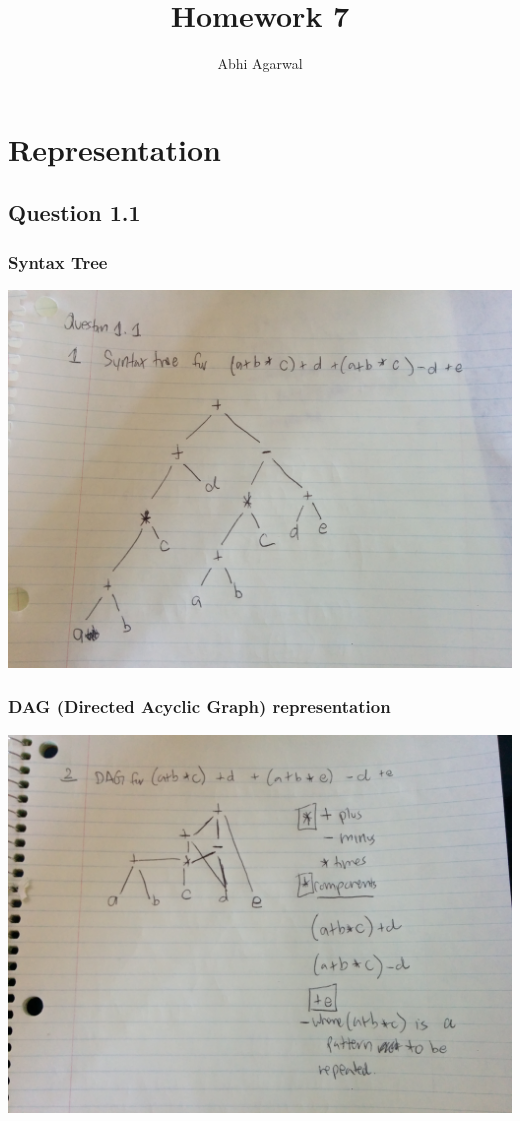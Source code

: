 \documentclass[11pt, oneside]{article}   	%
\title{Homework 7}
\author{Abhi Agarwal}
\date{}
\begin{document}
\maketitle

\section{Representation}

\subsection{Question 1.1}

\subsubsection{Syntax Tree}
\includegraphics[scale=0.15]{IMG_20141025_154037.jpg}

\subsubsection{DAG (Directed Acyclic Graph) representation}
\includegraphics[scale=0.15]{IMG_20141025_154052.jpg}
\end{document}

